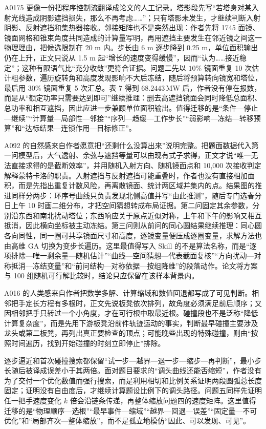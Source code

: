 A0175 更像一份把程序控制流翻译成论文的人工记录。塔影段先写“若塔身对某入射光线造成阴影遮挡损失，那么不再考虑……”；只有塔影未发生，才继续判断入射阴影、反射遮挡和集热器接收。邻接矩阵也不是突然出现：作者先将 1745 面镜、镜面网格和锥束角度共同造成的计算量写明，再用遮挡主要发生在邻近镜之间这一物理理由，把候选限制在 20 m 内。步长由 6 m 逐步降到 0.25 m，单位面积输出仍在上升，正文只说从 1.5 m 起“增长的速度变得缓慢”，因而“认为……接近稳定”；这种有限语气比“充分收敛”更符合证据。问题二先以 $10\%$ 镜面重复 10 次估计粗参数，遍历旋转角和高度发现影响不大后冻结，随后将预算转向镜宽和塔位，最后用 $30\%$ 镜面重复 5 次汇总。表 7 得到 $68.2443\,\mathrm{MW}$ 后，作者没有停在报数，而是从“额定功率只需要达到即可”继续推理：删去高遮挡镜面会同时降低总面积、总功率和相互遮挡，因此应进一步兼顾单位面积输出。值得迁移的是“条件—停止—继续”“计算量—局部性—邻接”“序列—趋缓—工作步长”“弱影响—冻结—转移预算”和“达标结果—连锁作用—目标修正”。

A092 的自然感来自作者愿意把“还剩什么没算出来”说明完整。把题面数据代入第一问模型后，大气透射、余弦与遮挡等量可以由现有式子求得，正文才说“唯一无法直接求得的是截断效率”，并用随机入射方向、随机镜面点和 10,000 次接收判定解释蒙特卡洛的职责。入射遮挡与反射遮挡可能重叠时，作者也没有直接相加面积，而是先指出重复计数风险，再离散镜面、统计两区域并集内的点。结果图的推进同样分两步：环序号曲线只负责发现北侧高值并写“由此推测”，随后专门选春分日上午 10 时画二维分布，才把空间猜想转成布局证据。第二问固定其余参数，分别沿东西和南北扰动塔位；东西响应关于原点近似对称，上午和下午的影响又相互抵消，因此横向坐标被主动冻结。第三问则从前问的同心圆结果继续推理：同心圆各向同性，同一圈可共享镜面尺寸和高度，逐镜变量便压成逐圈变量，求解方法也由高维 GA 切换为变步长遍历。这里最值得写入 Skill 的不是算法名称，而是“逐项排除—唯一剩余量—随机估计”“曲线—空间猜想—代表截面复核”“方向扰动—对称抵消—冻结变量”和“前问结构—对称依据—按组降维”的段落动作。论文将方案与 100 组随机可行解比较时，结论只应保留在该样本背景内。

A016 的人类感来自作者把数学多解、计算缩域和数值回退都写成了可见判断。相邻把手定长方程有多根时，正文先说板凳依次排列，故角度必须满足前后顺序；又因相邻把手只转过一个小角度，才在可行根中取最近根。碰撞段也不是泛称“降低计算复杂度”，而是先用下游板凳沿前件轨迹运动的事实，判断最早碰撞主要涉及龙头或第二板凳，再列出真正要检查的顶点；可能晚些出现的特殊碰撞，则由“按照时间遍历，找到开始碰撞的时刻立即停止”排除。

逐步逼近和首次碰撞搜索都保留“试一步—越界—退一步—缩步—再判断”，最小步长随后被译成误差小于其两倍。面对题目要求的“调头曲线还能否缩短”，作者没有为了交付一个优化数值而强行搜索，而是利用相切和比例关系证明两段圆弧总长度固定；证明没有自由度后，才继续计算题设比例下的调头路径。问题五同样先证明任一把手速度变化 $k$ 倍会沿链条传递，再整体缩放问题四的速度矩阵。这里值得迁移的是“物理顺序—选根”“最早事件—缩域”“越界—回退—误差”“固定量—不可优化”和“局部齐次—整体缩放”，而不是孤立地模仿“因此、可以发现、可见”。

